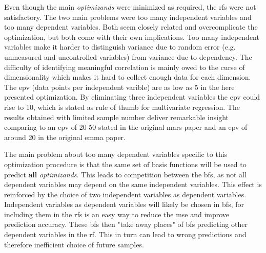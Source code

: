Even though the main \textit{optimizands} were minimized as required, the \gls{rf}s were not satisfactory. 
The two main problems were too many independent variables and too many dependent variables. 
Both seem closely related and overcomplicate the optimization, but both come with their own implications. 
Too many independent variables make it harder to distinguish variance due to random error (e.g. unmeasured and uncontrolled variables) from variance due to dependency. %
The difficulty of identifying meaningful correlation is mainly owed to the curse of dimensionality\cite{friedman1988fitting} which makes it hard to collect enough data for each dimension. 
%
The \gls{epv} (data points per independent varible) are as low as 5 in the here presented optimization. %
By eliminating three independent variables the \gls{epv} could rise to 10, which is stated 
as rule of thumb for multivariate regression\cite{vittinghoff2007relaxing}. 
The results obtained with limited sample number deliver remarkable insight %
comparing to an \gls{epv} of 20-50 stated in the original \gls{mars} paper\cite{friedman1991multivariate} 
and an \gls{epv} of around 20 in the original \gls{emma} paper\cite{villanova2010function}. 
%

The main problem about too many dependent variables specific to this optimization procedure 
is that the same set of basis functions will be used to predict \textbf{all} \textit{optimizands}.
This leads to competition between the \gls{bf}s, as not all dependent variables may depend on the same independent variables. 
This effect is reinforced by the choice of two independent variables as dependent variables. %
Independent variables as dependent variables will likely be chosen in \gls{bf}s, 
for including them in the \gls{rf}s is an easy way to reduce the \gls{mse} and improve prediction accuracy.
\enlargethispage{\baselineskip}
These \gls{bf}s then "take away places" of \gls{bf}s predicting other dependent variables in the \gls{rf}. %
This in turn can lead to wrong predictions and therefore inefficient choice of future samples. 

